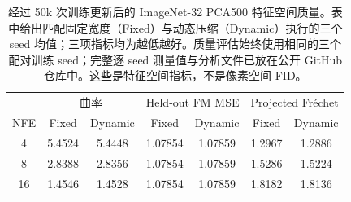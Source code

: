 \begin{table}[t]
\centering
\caption{经过 50k 次训练更新后的 ImageNet-32 PCA500 特征空间质量。表中给出匹配固定宽度（Fixed）与动态压缩（Dynamic）执行的三个 seed 均值；三项指标均为越低越好。质量评估始终使用相同的三个配对训练 seed；完整逐 seed 测量值与分析文件已放在公开 GitHub 仓库中。这些是特征空间指标，不是像素空间 FID。}
\label{tab:imagenet-quality}
\small
\begin{tabular}{@{}c cc cc cc@{}}
\toprule
& \multicolumn{2}{c}{曲率} & \multicolumn{2}{c}{Held-out FM MSE} & \multicolumn{2}{c}{Projected Fr\'echet} \\
NFE & Fixed & Dynamic & Fixed & Dynamic & Fixed & Dynamic \\
\midrule
4  & 5.4524 & 5.4448 & 1.07854 & 1.07859 & 1.2967 & 1.2886 \\
8  & 2.8388 & 2.8356 & 1.07854 & 1.07859 & 1.5286 & 1.5224 \\
16 & 1.4546 & 1.4528 & 1.07854 & 1.07859 & 1.8182 & 1.8136 \\
\bottomrule
\end{tabular}
\end{table}
